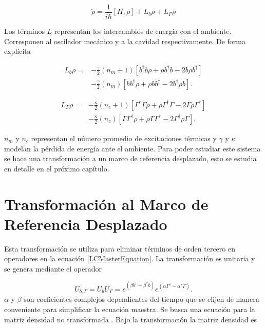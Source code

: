 \documentclass[10pt,a4paper]{report}
\begin{document}
\begin{equation} \label{LCMasterEquation}
\dot{\rho} = \frac{1}{i\hbar}[H,\rho] +L_b\rho + L_\Gamma \rho
\end{equation}

Los términos $L$ representan los intercambios de energía con el ambiente. Corresponen al oscilador mecánico y a la cavidad respectivamente. De forma explícita

\begin{align}
L_b \rho =& - \frac{\gamma}{2}(n_m + 1)[b^\dagger b\rho + \rho b^\dagger b -2b\rho b^\dagger]  \\
 &- \frac{\gamma}{2}(n_m)[ bb^\dagger\rho + \rho  bb^\dagger -2b^\dagger\rho b].\nonumber
\end{align} 

\begin{align}
L_\Gamma \rho =& - \frac{\kappa}{2}(n_c + 1)[\Gamma^\dagger \Gamma\rho + \rho \Gamma^\dagger \Gamma -2\Gamma\rho \Gamma^\dagger]  \\
 &- \frac{\kappa}{2}(n_c)[ \Gamma\Gamma^\dagger\rho + \rho  \Gamma\Gamma^\dagger -2\Gamma^\dagger\rho \Gamma].\nonumber
\end{align}

$n_m$ y $n_c$ representan el número promedio de excitaciones térmicas y $\gamma$ y $\kappa$ modelan la pérdida de energía ante el ambiente. Para poder estudiar este sistema se hace una transformación a  un marco de referencia desplazado, esto se estudia en detalle en el próximo capítulo.

\chapter{Transformación al Marco de Referencia Desplazado}

Esta transformación se utiliza para eliminar términos de orden tercero en operadores en la ecuación \eqref{LCMasterEquation}. La transformación es unitaria y se genera mediante el operador

\begin{equation}
U_{b,\Gamma} =  U_b U_\Gamma = e^{(\beta b^\dagger - \beta^* b)}e^{(\alpha\Gamma^\dagger - \alpha^* \Gamma)}.
\end{equation} $\alpha$ y $\beta$ son coeficientes complejos dependientes del tiempo que se elijen de manera conveniente para simplificar la ecuación maestra. Se busca una ecuación para la matriz densidad no transformada \cite{TesisMaestria}. Bajo la transformación la matriz densidad es
\end{document}
